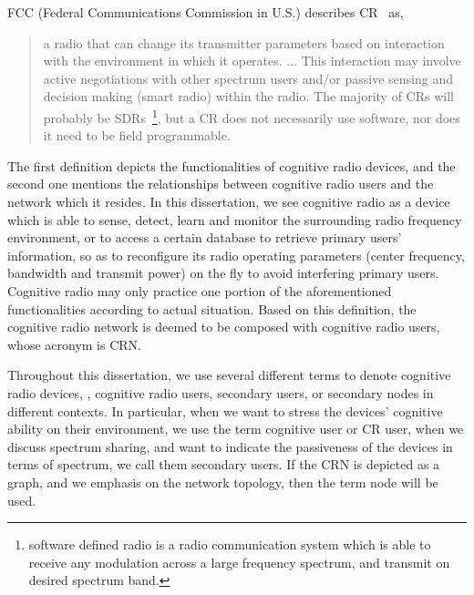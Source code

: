 FCC (Federal Communications Commission in U.S.) describes CR~\cite{FCC_03-322} as,
\blockquote{
a radio that can change its transmitter parameters based on interaction with the environment in which it operates. $\ldots$
This interaction may involve active negotiations with other spectrum users and/or passive sensing and decision making (smart radio) within the radio. 
The majority of CRs will probably be SDRs~\footnote{software defined radio is a radio communication system which is able to receive any modulation across a large frequency spectrum, and transmit on desired spectrum band.}, but a CR does not necessarily use software, nor does it need to be field programmable.
}

The first definition depicts the functionalities of cognitive radio devices, and the second one mentions the relationships between cognitive radio users and the network which it resides.
In this dissertation, we see cognitive radio as a device which is able to sense, detect, learn and monitor the surrounding radio frequency environment, or to access a certain database to retrieve primary users' information, so as to reconfigure its radio operating parameters (\eg center frequency, bandwidth and transmit power) on the fly to avoid interfering primary users.
Cognitive radio may only practice one portion of the aforementioned functionalities according to actual situation.
Based on this definition, the cognitive radio network is deemed to be composed with cognitive radio users, whose acronym is \gls{CRN}.

Throughout this dissertation, we use several different terms to denote cognitive radio devices, \ie, cognitive radio users, secondary users, or secondary nodes in different contexts.
In particular, when we want to stress the devices' cognitive ability on their environment, we use the term cognitive user or CR user, when we discuss spectrum sharing, and want to indicate the passiveness of the devices in terms of spectrum, we call them secondary users. 
If the CRN is depicted as a graph, and we emphasis on the network topology, then the term node will be used.


